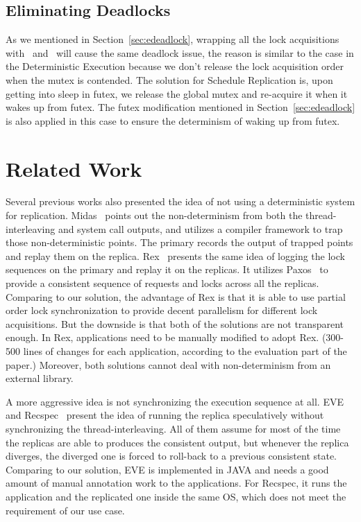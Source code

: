 \subsection{Eliminating Deadlocks} \label{sec:rdeadlock}
As we mentioned in Section~\ref{sec:edeadlock}, wrapping all the lock acquisitions with \detstart\ and \detend\ will cause the same deadlock issue, the reason is similar to the case in the Deterministic Execution because we don't release the lock acquisition order when the mutex is contended. The solution for Schedule Replication is, upon getting into sleep in futex, we release the global mutex and re-acquire it when it wakes up from futex. The futex modification mentioned in Section~\ref{sec:edeadlock} is also applied in this case to ensure the determinism of waking up from futex.

\section{Related Work}
Several previous works also presented the idea of not using a deterministic system for replication. Midas~\cite{slember2006static} points out the non-determinism from both the thread-interleaving and system call outputs, and utilizes a compiler framework to trap those non-deterministic points. The primary records the output of trapped points and replay them on the replica. Rex~\cite{guo2014rex} presents the same idea of logging the lock sequences on the primary and replay it on the replicas. It utilizes Paxos~\cite{lamport2001paxos} to provide a consistent sequence of requests and locks across all the replicas. Comparing to our solution, the advantage of Rex is that it is able to use partial order lock synchronization to provide decent parallelism for different lock acquisitions. But the downside is that both of the solutions are not transparent enough. In Rex, applications need to be manually modified to adopt Rex. (300-500 lines of changes for each application, according to the evaluation part of the paper.) Moreover, both solutions cannot deal with non-determinism from an external library.

A more aggressive idea is not synchronizing the execution sequence at all. EVE~\cite{kapritsos2012all} and Recspec~\cite{lee2010respec} present the idea of running the replica speculatively without synchronizing the thread-interleaving. All of them assume for most of the time the replicas are able to produces the consistent output, but whenever the replica diverges, the diverged one is forced to roll-back to a previous consistent state. Comparing to our solution, EVE is implemented in JAVA and needs a good amount of manual annotation work to the applications. For Recspec, it runs the application and the replicated one inside the same OS, which does not meet the requirement of our use case.

